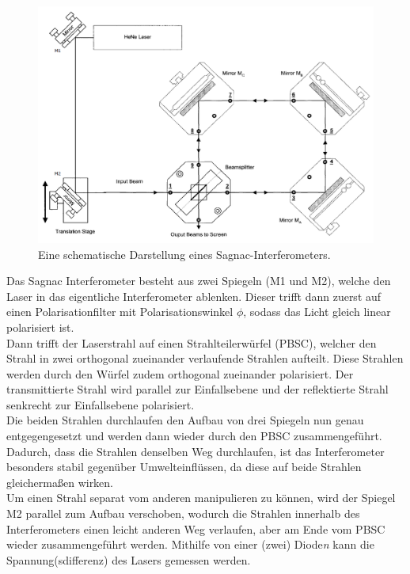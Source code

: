 \begin{figure}
    \centering
    \includegraphics[scale=0.4]{content/V64_pictures/Aufbau.png}
    \caption{Eine schematische Darstellung eines Sagnac-Interferometers. \cite{v64}}
    \label{fig:Aufbau}
\end{figure}
Das Sagnac Interferometer besteht aus zwei Spiegeln (M1 und M2), welche den Laser in das eigentliche Interferometer ablenken. Dieser trifft dann 
zuerst auf einen Polarisationfilter mit Polarisationswinkel $\phi$, sodass das Licht gleich linear polarisiert ist.\\
Dann trifft der Laserstrahl auf einen Strahlteilerwürfel (PBSC), welcher den Strahl in zwei orthogonal zueinander verlaufende Strahlen aufteilt. Diese Strahlen werden durch
den Würfel zudem orthogonal zueinander polarisiert. Der transmittierte Strahl wird parallel zur Einfallsebene und der reflektierte Strahl senkrecht
zur Einfallsebene polarisiert.\\
Die beiden Strahlen durchlaufen den Aufbau von drei Spiegeln nun genau entgegengesetzt und werden dann wieder durch den PBSC zusammengeführt. Dadurch, dass
die Strahlen denselben Weg durchlaufen, ist das Interferometer besonders stabil gegenüber Umwelteinflüssen, da diese auf beide Strahlen gleichermaßen wirken.\\
Um einen Strahl separat vom anderen manipulieren zu können, wird der Spiegel M2 parallel zum Aufbau verschoben, wodurch die Strahlen innerhalb des Interferometers einen
leicht anderen Weg verlaufen, aber am Ende vom PBSC wieder zusammengeführt werden. Mithilfe von einer (zwei) Diode\textit{n} kann die Spannung(sdifferenz) des Lasers
gemessen werden.

